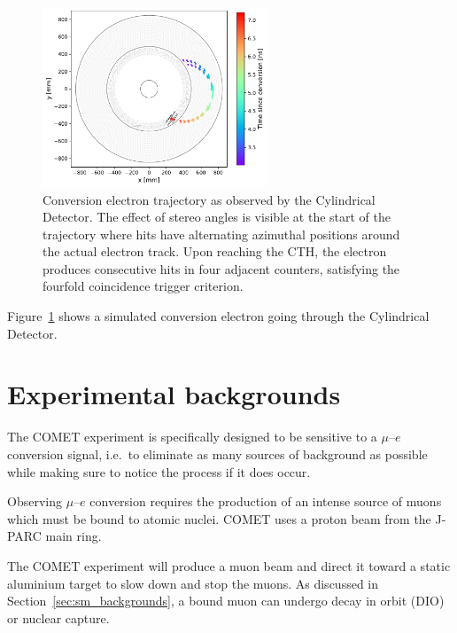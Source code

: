 \begin{figure}
    \centering
    \includegraphics[width=0.6\textwidth]{chapter2/cydet_signal_track_v3.pdf}
    \caption{ Conversion electron trajectory as observed by the Cylindrical
    Detector. The effect of stereo angles is visible at the start of the
    trajectory where hits have alternating azimuthal positions around the actual
    electron track. Upon reaching the CTH, the electron produces consecutive
    hits in four adjacent counters, satisfying the fourfold coincidence trigger
    criterion.}
    \label{fig:cydet_signal_event}
\end{figure}

Figure~\ref{fig:cydet_signal_event} shows a simulated conversion electron going
through the Cylindrical Detector.


\section{Experimental backgrounds}\label{sec:backgrounds}
The COMET experiment is specifically designed to be sensitive to a $\mu$--$e$
conversion signal, i.e.\ to eliminate as many sources of background as possible
while making sure to notice the process if it does occur. 

Observing $\mu$--$e$ conversion requires the production of an intense source of
muons which must be bound to atomic nuclei. COMET uses a proton beam from the
J-PARC main ring.


The COMET experiment will produce a muon beam and direct it toward a static
aluminium target to slow down and stop the muons. As discussed in
Section~\ref{sec:sm_backgrounds}, a bound muon can undergo decay in orbit (DIO)
or nuclear capture.


